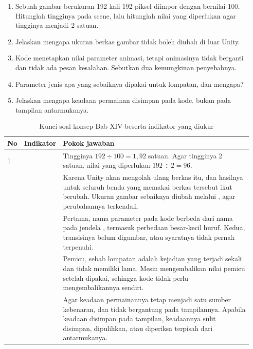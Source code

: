 \begin{enumerate}
  \item Sebuah gambar berukuran 192 kali 192 piksel diimpor dengan
         bernilai 100. Hitunglah tingginya pada scene,
        lalu hitunglah nilai yang diperlukan agar tingginya menjadi 2 satuan.
  \item Jelaskan mengapa ukuran berkas gambar tidak boleh diubah di luar Unity.
  \item Kode menetapkan nilai parameter animasi, tetapi animasinya tidak
        berganti dan tidak ada pesan kesalahan. Sebutkan dua kemungkinan
        penyebabnya.
  \item Parameter jenis apa yang sebaiknya dipakai untuk lompatan, dan mengapa?
  \item Jelaskan mengapa keadaan permainan disimpan pada kode, bukan pada
        tampilan antarmukanya.
\end{enumerate}

\begin{table}[htbp]
\centering
\caption{Kunci soal konsep Bab XIV beserta indikator yang diukur}
\label{tab:kunci-konsep-ch14}
{\setlength{\tabcolsep}{4pt}\footnotesize%
\begin{tabularx}{\textwidth}{@{}C{0.8cm} C{2.1cm} Y@{}}
\toprule
\headrow \textbf{No} & \textbf{Indikator} & \textbf{Pokok jawaban} \\
 &  &
Tingginya $192 \div 100 = 1{,}92$ satuan. Agar tingginya 2 satuan, nilai yang
diperlukan $192 \div 2 = 96$. \\
 &  &
Karena Unity akan mengolah ulang berkas itu, dan hasilnya untuk seluruh benda
yang memakai berkas tersebut ikut berubah. Ukuran gambar sebaiknya diubah
melalui , agar perubahannya terkendali. \\
 &  &
Pertama, nama parameter pada kode berbeda dari nama pada jendela
, termasuk perbedaan besar-kecil huruf. Kedua, transisinya
belum digambar, atau syaratnya tidak pernah terpenuhi. \\
 &  &
Pemicu, sebab lompatan adalah kejadian yang terjadi sekali dan tidak memiliki
lama. Mesin mengembalikan nilai pemicu setelah dipakai, sehingga kode tidak
perlu mengembalikannya sendiri. \\
 &  &
Agar keadaan permainannya tetap menjadi satu sumber kebenaran, dan tidak
bergantung pada tampilannya. Apabila keadaan disimpan pada tampilan, keadaannya
sulit disimpan, dipulihkan, atau diperiksa terpisah dari antarmukanya. \\
\bottomrule
\end{tabularx}}
\end{table}
